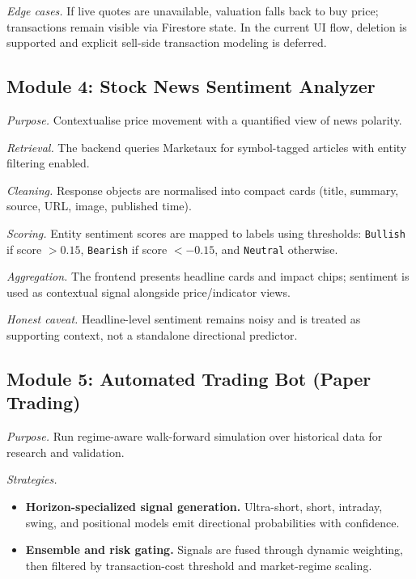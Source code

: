 \documentclass[12pt,a4paper]{report}
\numberwithin{equation}{chapter}
\begin{document}
\textit{Edge cases.} If live quotes are unavailable, valuation falls back to buy price; transactions remain visible via Firestore state. In the current UI flow, deletion is supported and explicit sell-side transaction modeling is deferred.

\subsection{Module 4: Stock News Sentiment Analyzer}

\textit{Purpose.} Contextualise price movement with a quantified view of news polarity.

\textit{Retrieval.} The backend queries Marketaux for symbol-tagged articles with entity filtering enabled.

\textit{Cleaning.} Response objects are normalised into compact cards (title, summary, source, URL, image, published time).

\textit{Scoring.} Entity sentiment scores are mapped to labels using thresholds: \texttt{Bullish} if score $> 0.15$, \texttt{Bearish} if score $< -0.15$, and \texttt{Neutral} otherwise.

\textit{Aggregation.} The frontend presents headline cards and impact chips; sentiment is used as contextual signal alongside price/indicator views.

\textit{Honest caveat.} Headline-level sentiment remains noisy and is treated as supporting context, not a standalone directional predictor.

\subsection{Module 5: Automated Trading Bot (Paper Trading)}

\textit{Purpose.} Run regime-aware walk-forward simulation over historical data for research and validation.

\textit{Strategies.}

\begin{itemize}
  \item \textbf{Horizon-specialized signal generation.} Ultra-short, short, intraday, swing, and positional models emit directional probabilities with confidence.
  \item \textbf{Ensemble and risk gating.} Signals are fused through dynamic weighting, then filtered by transaction-cost threshold and market-regime scaling.
\end{itemize}
\end{document}

